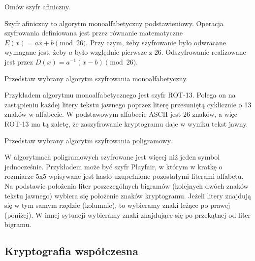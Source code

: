 \documentclass[answers,11pt]{exam}
\begin{document}
\begin{questions}
\question Omów szyfr afiniczny.
\begin{solution}
Szyfr afiniczny to algorytm monoalfabetyczny podstawieniowy. Operacja szyfrowania definiowana jest przez równanie matematyczne $E(x) = ax + b \pmod{26}$. Przy czym, żeby szyfrowanie było odwracane wymagane jest, żeby $a$ było względnie pierwsze z $26$. Odszyfrowanie realizowane jest przez $D(x) = a^{-1}(x-b) \pmod{26}$.
\end{solution}


\question Przedstaw wybrany algorytm szyfrowania monoalfabetyczny.
\begin{solution}
Przykładem algorytmu monoalfabetycznego jest szyfr ROT-13. Polega on na zastąpieniu każdej litery tekstu jawnego poprzez literę przesuniętą cyklicznie o 13 znaków w alfabecie. W podstawowym alfabecie ASCII jest 26 znaków, a więc ROT-13 ma tą zaletę, że zaszyfrowanie kryptogramu daje w wyniku tekst jawny.
\end{solution}

\question Przedstaw wybrany algorytm szyfrowania poligramowy.
\begin{solution}
W algorytmach poligramowych szyfrowane jest więcej niż jeden symbol jednocześnie. Przykładem może być szyfr Playfair, w którym w kratkę o rozmiarze 5x5 wpisywane jest hasło uzupełnione pozostałymi literami alfabetu. Na podstawie położenia liter poszczególnych bigramów (kolejnych dwóch znaków tekstu jawnego) wybiera się położenie znaków kryptogramu. Jeżeli litery znajdują się w tym samym rzędzie (kolumnie), to wybieramy znaki leżące po prawej (poniżej). W innej sytuacji wybieramy znaki znajdujące się po przekątnej od liter bigramu.  
\end{solution}


\end{questions}

\subsection{Kryptografia współczesna}
\end{document}
